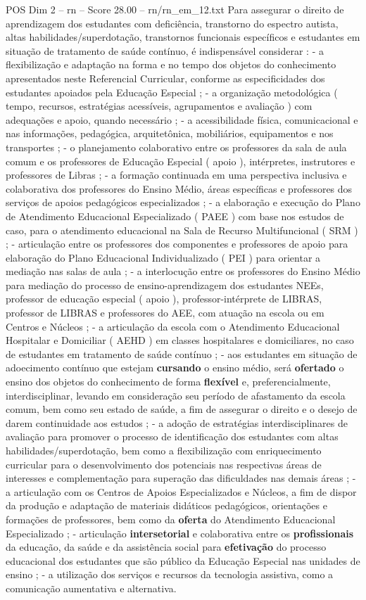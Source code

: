 \begin{textsample}{POS Dim 2 – rn – Score 28.00 – rn/rn\_em\_12.txt}
Para assegurar o direito de aprendizagem dos estudantes com deficiência, transtorno do espectro autista, altas habilidades/superdotação, transtornos funcionais específicos e estudantes em situação de tratamento de saúde contínuo, é indispensável considerar : - a flexibilização e adaptação na forma e no tempo dos objetos do conhecimento apresentados neste Referencial Curricular, conforme as especificidades dos estudantes apoiados pela Educação Especial ; - a organização metodológica ( tempo, recursos, estratégias acessíveis, agrupamentos e avaliação ) com adequações e apoio, quando necessário ; - a acessibilidade física, comunicacional e nas informações, pedagógica, arquitetônica, mobiliários, equipamentos e nos transportes ; - o planejamento colaborativo entre os professores da sala de aula comum e os professores de Educação Especial ( apoio ), intérpretes, instrutores e professores de Libras ; - a formação continuada em uma perspectiva inclusiva e colaborativa dos professores do Ensino Médio, áreas específicas e professores dos serviços de apoios pedagógicos especializados ; - a elaboração e execução do Plano de Atendimento Educacional Especializado ( PAEE ) com base nos estudos de caso, para o atendimento educacional na Sala de Recurso Multifuncional ( SRM ) ; - articulação entre os professores dos componentes e professores de apoio para elaboração do Plano Educacional Individualizado ( PEI ) para orientar a mediação nas salas de aula ; - a interlocução entre os professores do Ensino Médio para mediação do processo de ensino-aprendizagem dos estudantes NEEs, professor de educação especial ( apoio ), professor-intérprete de LIBRAS, professor de LIBRAS e professores do AEE, com atuação na escola ou em Centros e Núcleos ; - a articulação da escola com o Atendimento Educacional Hospitalar e Domiciliar ( AEHD ) em classes hospitalares e domiciliares, no caso de estudantes em tratamento de saúde contínuo ; - aos estudantes em situação de adoecimento contínuo que estejam \textbf{cursando} o ensino médio, será \textbf{ofertado} o ensino dos objetos do conhecimento de forma \textbf{flexível} e, preferencialmente, interdisciplinar, levando em consideração seu período de afastamento da escola comum, bem como seu estado de saúde, a fim de assegurar o direito e o desejo de darem continuidade aos estudos ; - a adoção de estratégias interdisciplinares de avaliação para promover o processo de identificação dos estudantes com altas habilidades/superdotação, bem como a flexibilização com enriquecimento curricular para o desenvolvimento dos potenciais nas respectivas áreas de interesses e complementação para superação das dificuldades nas demais áreas ; - a articulação com os Centros de Apoios Especializados e Núcleos, a fim de dispor da produção e adaptação de materiais didáticos pedagógicos, orientações e formações de professores, bem como da \textbf{oferta} do Atendimento Educacional Especializado ; - articulação \textbf{intersetorial} e colaborativa entre os \textbf{profissionais} da educação, da saúde e da assistência social para \textbf{efetivação} do processo educacional dos estudantes que são público da Educação Especial nas unidades de ensino ; - a utilização dos serviços e recursos da tecnologia assistiva, como a comunicação aumentativa e alternativa.

\end{textsample}
